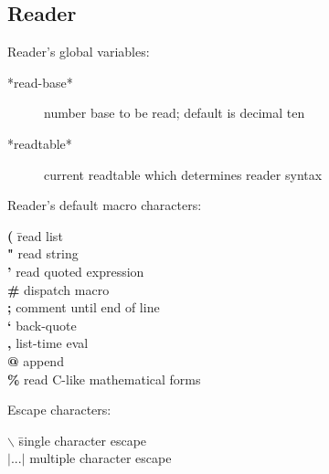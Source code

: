 \begin{refdesc}





\end{refdesc}
\newpage

%
%

\subsection{Reader}

Reader's global variables:

\begin{description}
\item[*read-base*] number base to be read; default is decimal ten
\item[*readtable*] current readtable which determines reader syntax
\end{description}

Reader's default macro characters:
\begin{tabbing}
{\bf (} \hspace{10mm} \=  read list \\
{\bf "} \>  read string \\
{\bf '} \>  read quoted expression \\
{\bf \#} \>  dispatch macro \\
{\bf ;} \>  comment until end of line \\
{\bf `} \>  back-quote \\
{\bf ,} \>  list-time eval \\
{\bf @} \>  append \\
{\bf \%} \>  read C-like mathematical forms \\
\end{tabbing}

Escape characters:

\begin{tabbing}
{\bf $\backslash$} \hspace{10mm} \=  single character escape \\
{\bf $|...|$} \>  multiple character escape \\
\end{tabbing}

